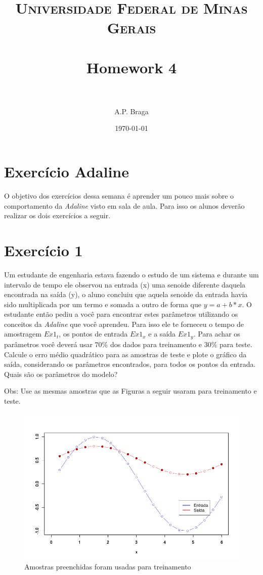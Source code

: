 \documentclass[paper=a4, fontsize=11pt]{scrartcl} %
\title{	
\normalfont \normalsize 
\textsc{Universidade Federal de Minas Gerais} \\ [25pt] %
\horrule{0.5pt} \\[0.4cm] %
\huge Homework 4 \\ %
\horrule{2pt} \\[0.5cm] %
}
\author{A.P. Braga} %
\date{\normalsize\today} %
\begin{document}
\maketitle %


\section*{Exercício Adaline}
O objetivo dos exercícios dessa semana é aprender um pouco mais sobre o comportamento da \textit{Adaline} visto em sala de aula. Para isso os alunos deverão realizar os dois exercícios a seguir.

\section*{Exercício 1}
Um estudante de engenharia estava fazendo o estudo de um sistema e durante um intervalo de tempo ele observou na entrada (x) uma senoide diferente daquela encontrada na saída (y), o aluno concluiu que aquela senoide da entrada havia sido multiplicada por um termo e somada a outro de forma que $y = a + b*x$. O estudante então pediu a você para encontrar estes parâmetros utilizando os conceitos da \textit{Adaline} que você aprendeu. Para isso ele te forneceu o tempo de amostragem $Ex1_t$, os pontos de entrada $Ex1_x$ e a saída $Ex1_y$. Para achar os parâmetros você deverá usar $70\%$ dos dados para treinamento e $30\%$ para teste. Calcule o erro médio quadrático para as amostras de teste e plote o gráfico da saída, considerando os parâmetros encontrados, para todos os pontos da entrada. Quais são os parâmetros do modelo?
\par Obs: Use as mesmas amostras que as Figuras a seguir usaram para treinamento e teste.

\begin{figure}
\centering
\includegraphics[width=0.7\linewidth]{Ex1a}
\caption{Amostras preenchidas foram usadas para treinamento}
\label{fig:Ex1a}
\end{figure}
\end{document}
